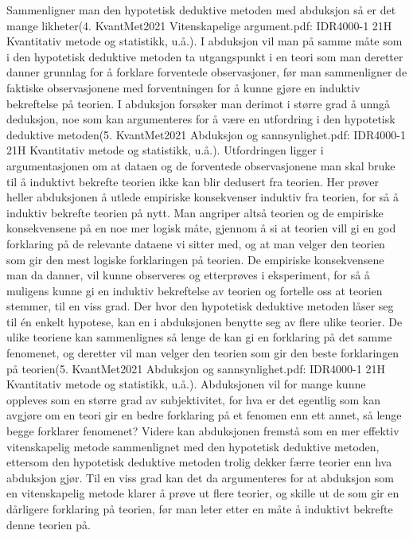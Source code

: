 \documentclass[
]{book}
\begin{document}
Sammenligner man den hypotetisk deduktive metoden med abduksjon så er det mange likheter(4. KvantMet2021 Vitenskapelige argument.pdf: IDR4000-1 21H Kvantitativ metode og statistikk, u.å.). I abduksjon vil man på samme måte som i den hypotetisk deduktive metoden ta utgangspunkt i en teori som man deretter danner grunnlag for å forklare forventede observasjoner, før man sammenligner de faktiske observasjonene med forventningen for å kunne gjøre en induktiv bekreftelse på teorien. I abduksjon forsøker man derimot i større grad å unngå deduksjon, noe som kan argumenteres for å være en utfordring i den hypotetisk deduktive metoden(5. KvantMet2021 Abduksjon og sannsynlighet.pdf: IDR4000-1 21H Kvantitativ metode og statistikk, u.å.). Utfordringen ligger i argumentasjonen om at dataen og de forventede observasjonene man skal bruke til å induktivt bekrefte teorien ikke kan blir dedusert fra teorien. Her prøver heller abduksjonen å utlede empiriske konsekvenser induktiv fra teorien, for så å induktiv bekrefte teorien på nytt. Man angriper altså teorien og de empiriske konsekvensene på en noe mer logisk måte, gjennom å si at teorien vill gi en god forklaring på de relevante dataene vi sitter med, og at man velger den teorien som gir den mest logiske forklaringen på teorien. De empiriske konsekvensene man da danner, vil kunne observeres og etterprøves i eksperiment, for så å muligens kunne gi en induktiv bekreftelse av teorien og fortelle oss at teorien stemmer, til en viss grad. Der hvor den hypotetisk deduktive metoden låser seg til én enkelt hypotese, kan en i abduksjonen benytte seg av flere ulike teorier. De ulike teoriene kan sammenlignes så lenge de kan gi en forklaring på det samme fenomenet, og deretter vil man velger den teorien som gir den beste forklaringen på teorien(5. KvantMet2021 Abduksjon og sannsynlighet.pdf: IDR4000-1 21H Kvantitativ metode og statistikk, u.å.). Abduksjonen vil for mange kunne oppleves som en større grad av subjektivitet, for hva er det egentlig som kan avgjøre om en teori gir en bedre forklaring på et fenomen enn ett annet, så lenge begge forklarer fenomenet? Videre kan abduksjonen fremstå som en mer effektiv vitenskapelig metode sammenlignet med den hypotetisk deduktive metoden, ettersom den hypotetisk deduktive metoden trolig dekker færre teorier enn hva abduksjon gjør. Til en viss grad kan det da argumenteres for at abduksjon som en vitenskapelig metode klarer å prøve ut flere teorier, og skille ut de som gir en dårligere forklaring på teorien, før man leter etter en måte å induktivt bekrefte denne teorien på.
\end{document}
